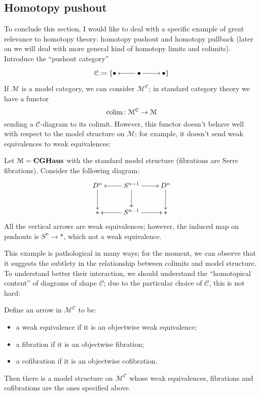 \begin{refsection}
\subsection{Homotopy pushout} \label{homotopy pushout}

To conclude this section, I would like to deal with a specific example of great relevance to homotopy theory: homotopy pushout and homotopy pullback (later on we will deal with more general kind of homotopy limits and colimits). Introduce the ``pushout category''
\[
\xymatrix{
\mathcal C\coloneqq \{ \bullet & \bullet \ar[l] \ar[r] & \bullet \}
}
\]
If $\mathcal M$ is a model category, we can consider $\mathcal M^{\mathcal C}$; in standard category theory we have a functor
\[
\operatorname*{colim} \colon \mathcal M^{\mathcal C} \to \mathcal M
\]
sending a $\mathcal C$-diagram to its colimit. However, this functor doesn't behave well with respect to the model structure on $\mathcal M$; for example, it doesn't send weak equivalences to weak equivalences:

\begin{eg} \label{eg pushout fails in homotopy}
Let $\mathcal M = \mathbf{CGHaus}$ with the standard model structure (fibrations are Serre fibrations). Consider the following diagram:
\[
\xymatrix{
D^n \ar[d] & S^{n-1} \ar[l] \ar[r] \ar[d] & D^n \ar[d] \\ \mathrm{*} & S^{n-1} \ar[r] \ar[l] & \mathrm{*}
}
\]
All the vertical arrows are weak equivalences; however, the induced map on pushouts is $S^n \to *$, which not a weak equivalence.
\end{eg}

This example is pathological in many ways; for the moment, we can observe that it suggests the subtlety in the relationship between colimits and model structure. To understand better their interaction, we should understand the ``homotopical content'' of diagrams of shape $\mathcal C$; due to the particular choice of $\mathcal C$, this is not hard:

\begin{lemma}
Define an arrow in $\mathcal M^{\mathcal C}$ to be:
\begin{itemize}
\item a weak equivalence if it is an objectwise weak equivalence;
\item a fibration if it is an objectwise fibration;
\item a cofibration if it is an objectwise cofibration.
\end{itemize}
Then there is a model structure on $\mathcal M^{\mathcal C}$ whose weak equivalences, fibrations and cofibrations are the ones specified above.
\end{lemma}


\end{refsection}

